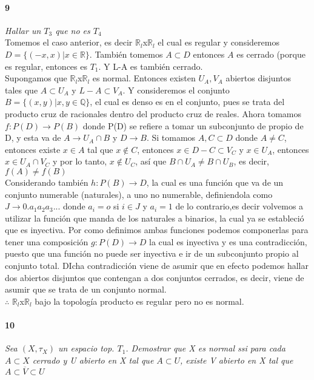 \documentclass[12pt]{article}
\begin{document}
\paragraph{9}
\textit{Hallar un $T_3$ que no es $T_4$}
\\Tomemos el caso anterior, es decir $\mathbb{R}_l$x$\mathbb{R}_l$ el cual es regular y consideremos $D=\{(-x,x)|x\in \mathbb{R}\}$. También tomemos $A \subset D$ entonces $A$ es cerrado (porque es regular, entonces es $T_1$. Y L-A es también cerrado. 
\\Supongamos que $\mathbb{R}_l$x$\mathbb{R}_l$ es normal. Entonces existen $U_A, V_A$ abiertos disjuntos tales que $A \subset U_A$ y $L-A \subset V_A$. Y consideremos el conjunto $B=\{ (x,y)|x,y\in \mathbb{Q}\}$, el cual es denso es en el conjunto, pues se trata del producto cruz de racionales dentro del producto cruz de reales. Ahora tomamos $f: P(D)\rightarrow P(B)$ donde P(D) se refiere a tomar un subconjunto de propio de D, y esta va de $A \rightarrow U_A\cap B$ y $D\rightarrow B$. Si tomamos $A,C \subset D$ donde $A\not =C$, entonces existe $x \in A$ tal que $x \notin C$, entonces $x\in D-C\subset V_C$ y $x\in U_A$, entonces $x \in U_A\cap V_C$ y por lo tanto, $x\notin U_C$, así que $B\cap U_A\not = B\cap U_B$, es decir, $f(A)\not =f(B)$
\\Considerando también $h: P(B)\rightarrow D$, la cual es una función que va de un conjunto numerable (naturales), a uno no numerable, definiendola como $J\rightarrow 0.a_1a_2a_3...$ donde $a_i= o $ si $i\in J$ y $a_i=1$ de lo contrario,es decir volvemos a utilizar la función que manda de los naturales a binarios, la cual ya se estableció que es inyectiva. Por como definimos ambas funciones podemos componerlas para tener una composición $g:P(D)\rightarrow D$ la cual es inyectiva y es una contradicción, puesto que una función no puede ser inyectiva e ir de un subconjunto propio al conjunto total. DIcha contradicción viene de asumir que en efecto podemos hallar dos abiertos disjuntos que contengan a dos conjuntos cerrados, es decir, viene de asumir que se trata de un conjunto normal.
\\$\therefore$ $\mathbb{R}_l$x$\mathbb{R}_l$ bajo la topología producto es regular pero no es normal.
\paragraph{10}
\textit{Sea $(X,\tau_X)$ un  espacio top. $T_1$. Demostrar que X es normal ssi para cada $A\subset X$ cerrado y U abierto en X tal que $A\subset U$, existe V abierto en X tal que $A\subset\overline{V}\subset U$}
\end{document}
